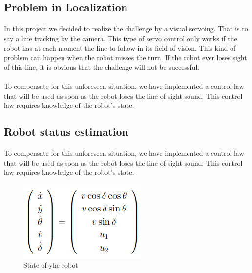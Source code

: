 \subsection{Problem in Localization}

\paragraph{}
In this project we decided to realize the challenge by a visual servoing. That is to say a line tracking by the camera. 
This type of servo control only works if the robot has at each moment the line to follow in its field of vision. 
This kind of problem can happen when the robot misses the turn. 
If the robot ever loses sight of this line, it is obvious that the challenge will not be successful. 

\paragraph{}
\paragraph{}To compensate for this unforeseen situation, we have implemented a control law that will be used as soon as the robot 
loses the line of sight sound. 
This control law requires knowledge of the robot's state.

\subsection{Robot status estimation}

\paragraph{}
To compensate for this unforeseen situation, 
we have implemented a control law that will be used as soon as the robot loses the line of sight sound. 
This control law requires knowledge of the robot's state.


\begin{figure}[!ht]
    \begin{center}
        \includegraphics[scale=0.6]{Images/Etat_tricycle.png}
    \end{center}
    \caption{State of yhe robot}
    \label{fig:State}
\end{figure}

